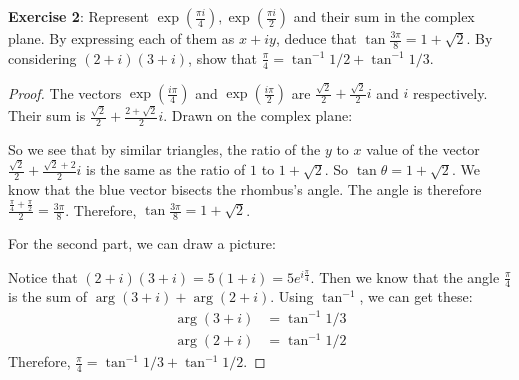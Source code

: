 \documentclass{article}
\begin{document}
\textbf{Exercise 2}: Represent $\exp(\frac{\pi i}{4}), \exp(\frac{\pi i}{2})$ and their sum in the complex plane. By expressing each of them as $x + iy$, deduce that $\tan{\frac{3\pi}{8}} = 1 + \sqrt{2}$. By considering $(2 + i)(3 + i)$, show that $\frac{\pi}{4} = \tan^{-1}{1/2} + \tan^{-1}{1/3}$.
    \begin{proof}
        The vectors $\exp(\frac{i\pi}{4})$ and $\exp(\frac{i\pi}{2})$ are $\frac{\sqrt{2}}{2} + \frac{\sqrt{2}}{2}i$ and $i$ respectively. Their sum is $\frac{\sqrt{2}}{2} + \frac{2 + \sqrt{2}}{2}i$. Drawn on the complex plane:
            \begin{fixedfigure}
            \end{fixedfigure}
        So we see that by similar triangles, the ratio of the $y$ to $x$ value of the vector $\frac{\sqrt{2}}{2} + \frac{\sqrt{2} + 2}{2}i$ is the same as the ratio of $1$ to $1 + \sqrt{2}$. So $\tan{\theta} = 1 + \sqrt{2}$. We know that the blue vector bisects the rhombus's angle. The angle is therefore $\frac{\frac{\pi}{4} + \frac{\pi}{2}}{2} = \frac{3\pi}{8}$. Therefore, $\tan{\frac{3\pi}{8}} = 1 + \sqrt{2}$.

        For the second part, we can draw a picture:
            \begin{fixedfigure}
            \end{fixedfigure}
        Notice that $(2 + i)(3 + i) = 5(1 + i) = 5e^{i\frac{\pi}{4}}$. Then we know that the angle $\frac{\pi}{4}$ is the sum of $\mathop{arg}(3 + i) + \mathop{arg}(2 + i)$. Using $\tan^{-1}$, we can get these:
            \begin{align*}
                \mathop{arg}(3 + i) &= \tan^{-1}{1/3} \\
                \mathop{arg}(2 + i) &= \tan^{-1}{1/2}   
            \end{align*}
        Therefore, $\frac{\pi}{4} = \tan^{-1}{1/3} + \tan^{-1}{1/2}$.
    \end{proof}
\end{document}
